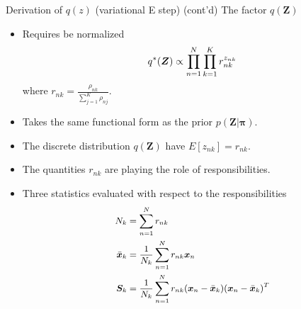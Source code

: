 \documentclass[10pt,mathserif]{beamer}
\begin{document}
\begin{frame}{Derivation of $q(z)$ (variational E step) (cont'd)}
The factor $q(\bm{Z})$
\begin{itemize}
    \item Requires be normalized
    \begin{equation}\small
        q^*(\bm{Z}) \propto \prod_{n=1}^N\prod_{k=1}^K r_{nk}^{z_{nk}}    
    \end{equation}
    where $r_{nk} = \frac{\rho_{nk}}{\sum_{j=1}^K \rho_{nj}}$.
    \item Takes the same functional form as the prior $p(\bm{Z}|\bm{\pi})$.
    \item The discrete distribution $q(\bm{Z})$ have $E[z_{nk}] = r_{nk}$.
    \item The quantities $r_{nk}$ are playing the role of responsibilities.
    \item Three statistics evaluated with respect to the responsibilities
    \begin{equation}\small
        \begin{split}
            N_k & = \sum_{n=1}^N r_{nk}\\
            \bar{\bm{x}}_k & = \frac{1}{N_k}\sum_{n=1}^N r_{nk}\bm{x}_n\\
            \bm{S}_k & = \frac{1}{N_k}\sum_{n=1}^N r_{nk}(\bm{x}_n - \bar{\bm{x}}_k)(\bm{x}_n - \bar{\bm{x}}_k)^T
        \end{split}
    \end{equation}
\end{itemize}
\end{frame}
\end{document}
